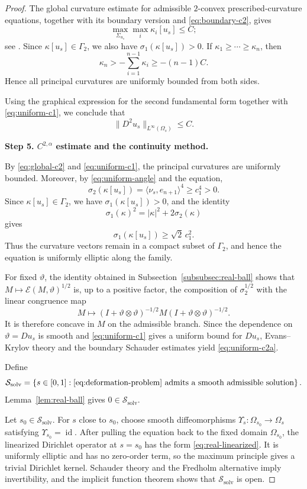 \documentclass{article}
\numberwithin{equation}{section}
\begin{document}
\begin{proof}
The global curvature estimate for admissible $2$-convex
prescribed-curvature equations, together with its boundary version
and \eqref{eq:boundary-c2}, gives
\[
\max_{\Sigma_{u_s}}\max_i\kappa_i[u_s]\le C;
\]
see \cite{GRW15}. Since $\kappa[u_s]\in\Gamma_2$, we also have
$\sigma_1(\kappa[u_s])>0$. If
$\kappa_1\ge\cdots\ge\kappa_n$, then
\[
\kappa_n
>
-\sum_{i=1}^{n-1}\kappa_i
\ge -(n-1)C.
\]
Hence all principal curvatures are uniformly bounded from both sides.

Using the graphical expression for the second fundamental form
together with \eqref{eq:uniform-c1}, we conclude that
\begin{equation}\label{eq:global-c2}
\|D^2u_s\|_{L^\infty(\Omega_s)}\le C.
\end{equation}

\medskip
\noindent\textbf{Step 5. $C^{2,\alpha}$ estimate and the continuity method.}

By \eqref{eq:global-c2} and \eqref{eq:uniform-c1}, the principal
curvatures are uniformly bounded. Moreover, by
\eqref{eq:uniform-angle} and the equation,
\[
\sigma_2(\kappa[u_s])
=
\langle\nu_s,e_{n+1}\rangle^4
\ge c_1^4>0.
\]
Since $\kappa[u_s]\in\Gamma_2$, we have
$\sigma_1(\kappa[u_s])>0$, and the identity
\[
\sigma_1(\kappa)^2
=
|\kappa|^2+2\sigma_2(\kappa)
\]
gives
\[
\sigma_1(\kappa[u_s])\ge \sqrt{2}\,c_1^2.
\]
Thus the curvature vectors remain in a compact subset of
$\Gamma_2$, and hence the equation is uniformly elliptic along
the family.

For fixed $\vartheta$, the identity obtained in
Subsection~\ref{subsubsec:real-ball} shows that
$M\mapsto\mathcal E(M,\vartheta)^{1/2}$ is, up to a positive
factor, the composition of $\sigma_2^{1/2}$ with the linear
congruence map
\[
M\longmapsto
(I+\vartheta\otimes\vartheta)^{-1/2}
M
(I+\vartheta\otimes\vartheta)^{-1/2}.
\]
It is therefore concave in $M$ on the admissible branch.
Since the dependence on $\vartheta=Du_s$ is smooth and
\eqref{eq:uniform-c1} gives a uniform bound for $Du_s$,
Evans--Krylov theory and the boundary Schauder estimates yield
\eqref{eq:uniform-c2a}.

Define
\[
\mathcal S_{\mathrm{solv}}
=
\left\{
s\in[0,1]:
\eqref{eq:deformation-problem}
\text{ admits a smooth admissible solution}
\right\}.
\]
Lemma~\ref{lem:real-ball} gives $0\in\mathcal S_{\mathrm{solv}}$.

Let $s_0\in\mathcal S_{\mathrm{solv}}$. For $s$ close to $s_0$,
choose smooth diffeomorphisms
$\Upsilon_s:\Omega_{s_0}\to\Omega_s$ satisfying
$\Upsilon_{s_0}=\operatorname{id}$. After pulling the equation back
to the fixed domain $\Omega_{s_0}$, the linearized Dirichlet operator
at $s=s_0$ has the form \eqref{eq:real-linearized}. It is uniformly
elliptic and has no zero-order term, so the maximum principle gives
a trivial Dirichlet kernel. Schauder theory and the Fredholm
alternative imply invertibility, and the implicit function theorem
shows that $\mathcal S_{\mathrm{solv}}$ is open.


\end{proof}
\end{document}
